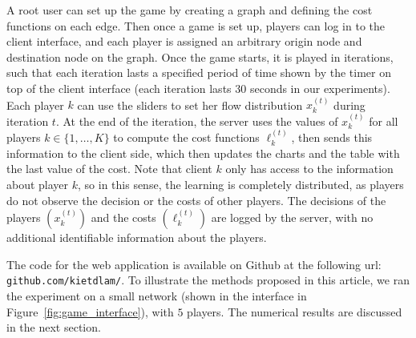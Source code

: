 \documentclass{sig-alternate-ipsn13}
\begin{document}
A root user can set up the game by creating a graph and defining the cost functions on each edge. Then once a game is set up, players can log in to the client interface, and each player is assigned an arbitrary origin node and destination node on the graph. Once the game starts, it is played in iterations, such that each iteration lasts a specified period of time shown by the timer on top of the client interface (each iteration lasts $30$ seconds in our experiments). Each player $k$ can use the sliders to set her flow distribution $x^{(t)}_k$ during iteration $t$. At the end of the iteration, the server uses the values of $x_k^{(t)}$ for all players $k \in \{1, \dots, K\}$ to compute the cost functions $\ell^{(t)}_k$, then sends this information to the client side, which then updates the charts and the table with the last value of the cost. Note that client $k$ only has access to the information about player $k$, so in this sense, the learning is completely distributed, as players do not observe the decision or the costs of other players. The decisions of the players $(x_k^{(t)})$ and the costs $(\ell^{(t)}_k)$ are logged by the server, with no additional identifiable information about the players.

The code for the web application is available on Github at the following url: \texttt{github.com/kietdlam/}. To illustrate the methods proposed in this article, we ran the experiment on a small network (shown in the interface in Figure~\ref{fig:game_interface}), with $5$ players. The numerical results are discussed in the next section.





\end{document}
